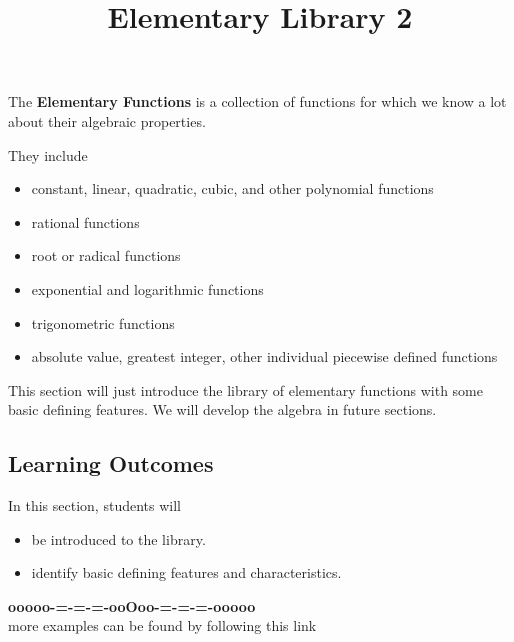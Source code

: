 \documentclass{ximera}
\title{Elementary Library 2}
\begin{document}
\begin{abstract}
\end{abstract}
\maketitle




The \textbf{Elementary Functions} is a collection of functions for which we know a lot about their algebraic properties.

They include 

\begin{itemize}
\item constant, linear, quadratic, cubic, and other polynomial functions
\item rational functions
\item root or radical functions
\item exponential and logarithmic functions
\item trigonometric functions
\item absolute value, greatest integer, other individual piecewise defined functions
\end{itemize}



This section will just introduce the library of elementary functions with some basic defining features.  We will develop the algebra in future sections.












\subsection*{Learning Outcomes}

\begin{sectionOutcomes}
In this section, students will 

\begin{itemize}
\item be introduced to the library.
\item identify basic defining features and characteristics.
\end{itemize}
\end{sectionOutcomes}







\begin{center}
\textbf{\textcolor{green!50!black}{ooooo-=-=-=-ooOoo-=-=-=-ooooo}} \\

more examples can be found by following this link\\ 

\end{center}
\end{document}
